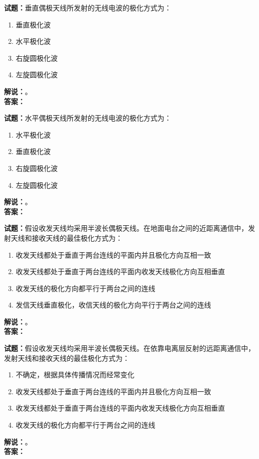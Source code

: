 \documentclass{ctexbook}
\begin{document}
\bigskip

\noindent\textbf{试题：}垂直偶极天线所发射的无线电波的极化方式为：
\begin{enumerate}[leftmargin=3em]
  \item 垂直极化波
  \item 水平极化波
  \item 右旋圆极化波
  \item 左旋圆极化波
\end{enumerate}
\noindent\textbf{解说：}\textbf{}。\\\noindent\textbf{答案：}

\bigskip

\noindent\textbf{试题：}水平偶极天线所发射的无线电波的极化方式为：
\begin{enumerate}[leftmargin=3em]
  \item 水平极化波
  \item 垂直极化波
  \item 右旋圆极化波
  \item 左旋圆极化波
\end{enumerate}
\noindent\textbf{解说：}\textbf{}。\\\noindent\textbf{答案：}

\bigskip

\noindent\textbf{试题：}假设收发天线均采用半波长偶极天线。在地面电台之间的近距离通信中，发射天线和接收天线的最佳极化方式为：
\begin{enumerate}[leftmargin=3em]
  \item 收发天线都处于垂直于两台连线的平面内并且极化方向互相一致
  \item 收发天线都处于垂直于两台连线的平面内收发天线极化方向互相垂直
  \item 收发天线的极化方向都平行于两台之间的连线
  \item 发信天线垂直极化，收信天线的极化方向平行于两台之间的连线
\end{enumerate}
\noindent\textbf{解说：}\textbf{}。\\\noindent\textbf{答案：}

\bigskip

\noindent\textbf{试题：}假设收发天线均采用半波长偶极天线。在依靠电离层反射的远距离通信中，发射天线和接收天线的最佳极化方式为：
\begin{enumerate}[leftmargin=3em]
  \item 不确定，根据具体传播情况而经常变化
  \item 收发天线都处于垂直于两台连线的平面内并且极化方向互相一致
  \item 收发天线都处于垂直于两台连线的平面内收发天线极化方向互相垂直
  \item 收发天线的极化方向都平行于两台之间的连线
\end{enumerate}
\noindent\textbf{解说：}\textbf{}。\\\noindent\textbf{答案：}
\end{document}
